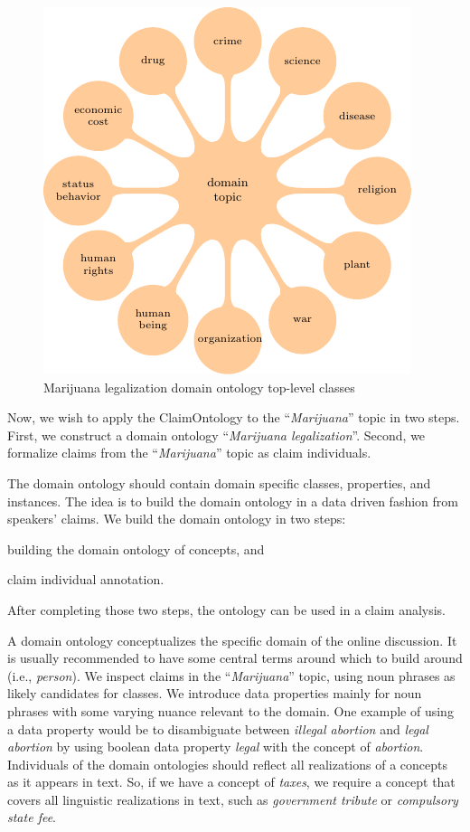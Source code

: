 \begin{figure}
	\centering
	\includegraphics{formalizations_mindmap-figure0.pdf}
\caption{Marijuana legalization domain ontology top-level classes}
\label{fig:marijuana_domain_ontology}
\end{figure}

Now, we wish to apply the ClaimOntology to the ``\emph{Marijuana}'' topic in
two steps.  First, we construct a domain ontology ``\emph{Marijuana
legalization}''.  Second, we formalize claims from the ``\emph{Marijuana}''
topic as claim individuals. 

The domain ontology should contain domain specific classes, properties, and
instances. The idea is to build the domain ontology in a data driven 
fashion from speakers' claims. We build the domain ontology in two steps:
\begin{enumerate*}[label=(\arabic*)]
\item building the domain ontology of concepts, and 
\item claim individual annotation. 
\end{enumerate*}
After completing those two steps, the ontology can be used in a claim analysis. 

A domain ontology conceptualizes the specific domain of the online discussion. 
It is usually recommended to have some central terms around which to build
around (i.e., \emph{person}). We inspect claims in the ``\emph{Marijuana}'' topic,
using noun phrases as likely candidates for classes. We introduce
data properties mainly for noun phrases with some varying nuance relevant to
the domain. One example of using a data property would be to disambiguate between
\emph{illegal abortion} and \emph{legal abortion} by using boolean data
property \emph{legal} with the concept of \emph{abortion}.
Individuals of the domain ontologies should reflect all realizations of a concepts as
it appears in text. So, if we have a concept of \emph{taxes}, we require a concept
that covers all linguistic realizations in text, such as \emph{government tribute} or
\emph{compulsory state fee}. 

